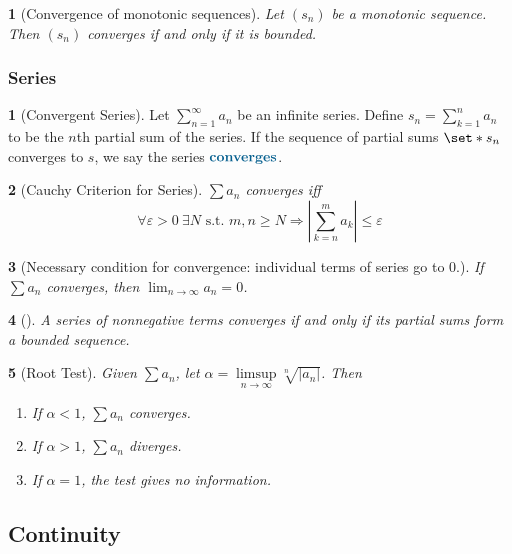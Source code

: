 \documentclass[12pt]{article}
\numberwithin{equation}{section}
\newcommand{\navy}[1]{\textcolor{MidnightBlue}{\bf #1}}
\theoremstyle{plain}
\newtheorem{theorem}{\color{ForestGreen}{\textbf{Theorem}}}[section]
\theoremstyle{definition}
\newtheorem{definition}{\color{MidnightBlue}{\textbf{Definition}}}[section]
\newcommand\abs[1]{\left| #1 \right|}
\def\Set{\set*}%
\def\imp{\Rightarrow}
\newcommand{\1}{\mathbbm 1}
\newcommand{\e}{\varepsilon}
\begin{document}
\begin{theorem}[Convergence of monotonic sequences]
	Let $(s_n)$ be a monotonic sequence. Then $(s_n)$ converges if and only if it is bounded. 
\end{theorem}

\subsubsection{Series}

\begin{definition}[Convergent Series]
	Let $\sum_{n=1}^\infty a_n$ be an infinite series. Define $s_n = \sum_{k=1}^n a_n$ to be the $n$th partial sum of the series. If the sequence of partial sums $\Set{s_n}$ converges to $s$, we say the series $\navy{converges}$.  
\end{definition}

\begin{theorem}[Cauchy Criterion for Series]
	$\sum a_n$ converges iff
	\begin{equation}
		\forall \e > 0 \ \exists N \text{ s.t. } m,n \geq N \imp \abs{\sum_{k=n}^m a_k} \leq \e
	\end{equation}
\end{theorem}

\begin{theorem}[Necessary condition for convergence: individual terms of series go to $0$.]
	If $\sum a_n$ converges, then $\lim_{n \to \infty} a_n = 0$. 
\end{theorem}

\begin{theorem}[]
	A series of nonnegative terms converges if and only if its partial sums form a bounded sequence. 
\end{theorem}

\begin{theorem}[Root Test]
	Given $\sum a_n$, let $\alpha = \limsup\limits_{n \to \infty} \sqrt[n]{\abs{a_n}}$. Then
	\begin{enumerate}
		\item If $\alpha < 1$, $\sum a_n$ converges.
		\item If $\alpha > 1$, $\sum a_n$ diverges.
		\item If $\alpha = 1$, the test gives no information. 
	\end{enumerate}
\end{theorem}




\subsection{Continuity}
\end{document}
